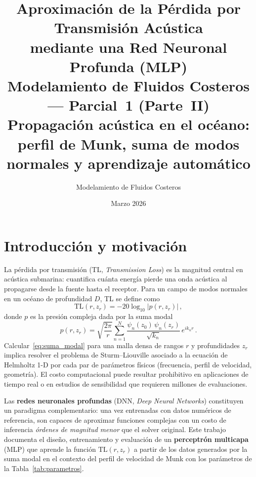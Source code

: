 \documentclass[12pt,a4paper]{article}
\title{%
  \textbf{Aproximación de la Pérdida por Transmisión Acústica}\\[0.4em]
  \textbf{mediante una Red Neuronal Profunda (MLP)}\\[0.6em]
  \large Modelamiento de Fluidos Costeros — Parcial~1 (Parte~II)\\[0.3em]
  \normalsize Propagación acústica en el océano: perfil de Munk,
              suma de modos normales y aprendizaje automático
}
\author{Modelamiento de Fluidos Costeros}
\date{Marzo 2026}
\newcommand{\TL}{\mathrm{TL}}
\begin{document}
\maketitle
\tableofcontents
\newpage

\section{Introducción y motivación}

La pérdida por transmisión (TL, \emph{Transmission Loss}) es la magnitud
central en acústica submarina: cuantifica cuánta energía pierde una onda
acústica al propagarse desde la fuente hasta el receptor.
Para un campo de modos normales en un océano de profundidad $D$, TL se define
como
\begin{equation}
  \TL(r,z_r) = -20\log_{10}|p(r,z_r)|\,,
  \label{eq:TL_def}
\end{equation}
donde $p$ es la presión compleja dada por la suma modal~\cite{jensen2011}
\begin{equation}
  p(r,z_r) = \sqrt{\frac{2\pi}{r}}
              \sum_{n=1}^{N}
              \frac{\psi_n(z_0)\,\psi_n(z_r)}{\sqrt{k_n}}
              \,e^{i k_n r}\,.
  \label{eq:suma_modal}
\end{equation}
Calcular~\eqref{eq:suma_modal} para una malla densa de rangos $r$ y
profundidades $z_r$ implica resolver el problema de Sturm--Liouville
asociado a la ecuación de Helmholtz 1-D por cada par de parámetros
físicos (frecuencia, perfil de velocidad, geometría). El costo computacional
puede resultar prohibitivo en aplicaciones de tiempo real o en estudios de
sensibilidad que requieren millones de evaluaciones.

Las \textbf{redes neuronales profundas} (DNN, \emph{Deep Neural Networks})
constituyen un paradigma complementario: una vez entrenadas con datos
numéricos de referencia, son capaces de aproximar funciones complejas con
un costo de inferencia \emph{órdenes de magnitud menor} que el solver original.
Este trabajo documenta el diseño, entrenamiento y evaluación de un
\textbf{perceptrón multicapa} (MLP) que aprende la función
$\TL(r,z_r)$ a partir de los datos generados por la suma modal en el contexto
del perfil de velocidad de Munk con los parámetros de la
Tabla~\ref{tab:parametros}.
\end{document}
